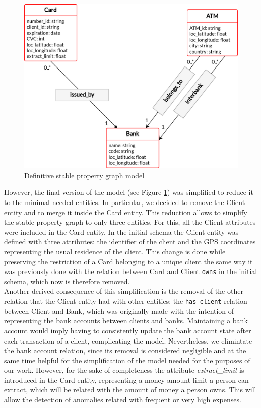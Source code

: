 \documentclass{article}
\begin{document}
\begin{figure}[H]
    \centering
    \includegraphics[scale = 0.7]{images/PG-stable-1-edit-cardinal.png}
    \caption{Definitive stable property graph model}
    \label{img:pg-stable-def}
\end{figure}

However, the final version of the model (see Figure \ref{img:pg-stable-def}) was simplified to reduce it to the minimal needed entities. In particular, we decided to remove the Client entity and to merge it inside the Card entity. This reduction allows to simplify the stable property graph to only three entities. 
For this, all the Client attributes were included in the Card entity. In the initial schema the Client entity was defined with three attributes: the identifier of the client and the GPS coordinates representing the usual residence of the client. This change is done while preserving the restriction of a Card belonging to a unique client the same way it was previously done with the relation between Card and Client \texttt{owns} in the initial schema, which now is therefore removed. \\
Another derived consequence of this simplification is the removal of the other relation that the Client entity had with other entities: the \texttt{has\_client} relation between Client and Bank, which was originally made with the intention of representing the bank accounts between clients and banks. Maintaining a bank account would imply having to consistently update the bank account state after each transaction of a client, complicating the model. Nevertheless, we elimintate the bank account relation, since its removal is considered negligible and at the same time helpful for the simplification of the model needed for the purposes of our work. However, for the sake of completeness the attribute \textit{extract\_limit} is introduced in the Card entity, representing a money amount limit a person can extract, which will be related with the amount of money a person owns. This will allow the detection of anomalies related with frequent or very high expenses.
\end{document}
